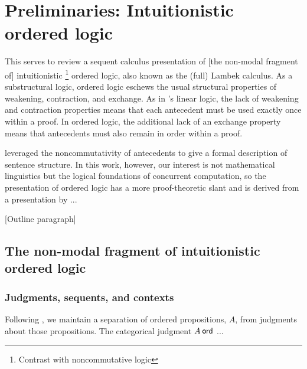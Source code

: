 \chapter{Preliminaries: Intuitionistic ordered logic}\label{ch:ordered-logic}



This  serves to review a sequent calculus presentation of [the non-modal fragment of]
intuitionistic%
\footnote{Contrast with noncommutative logic}
ordered logic, also known as the (full) Lambek calculus\autocites{Lambek:AMM58}{Lambek:SLIM61}.
As a substructural logic, ordered logic eschews the usual structural properties of weakening, contraction, and exchange.
As in \citeauthor{Girard:TCS??}'s linear logic\autocite{Girard:TCS??}, the lack of weakening and contraction properties means that each antecedent must be used exactly once within a proof.
In ordered logic, the additional lack of an exchange property means that antecedents must also remain in order within a proof.

 leveraged the noncommutativity of antecedents to give a formal description of sentence structure.
In this work, however, our interest is not mathematical linguistics but the logical foundations of concurrent computation, so the presentation of ordered logic has a more proof-theoretic slant and is derived from a presentation by ...


[Outline paragraph]


\section{The non-modal fragment of intuitionistic ordered logic}

\subsection{Judgments, sequents, and contexts}

Following \citeauthor{Martin-Lof:NJPL96}\autocite{Martin-Lof:NJPL96}, we maintain a separation of ordered propositions, $A$, from judgments about those propositions.
  The categorical judgment $A \ord$ ... 

